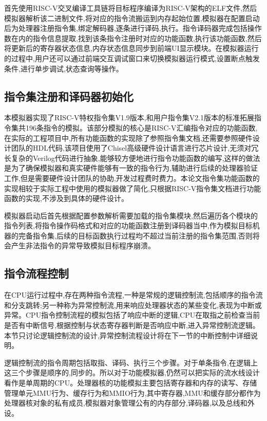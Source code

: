 首先使用RISC-V交叉编译工具链将目标程序编译为RISC-V架构的ELF文件,然后模拟器解析该二进制文件,将对应的指令流搬运到内存起始位置,模拟器在配置启动后为处理器注册指令集,绑定解码器,逐条进行译码,执行。指令译码器完成包括操作数在内的指令信息提取,找到该条指令注册时对应的功能函数,执行该功能函数,然后将更新后的寄存器状态信息,内存状态信息同步到前端UI显示模块。在模拟器运行的过程中,用户还可以通过前端交互调试窗口来切换模拟器运行模式,设置断点触发条件,进行单步调试,状态查询等操作。


\subsection{指令集注册和译码器初始化}
本模拟器实现了RISC-V特权指令集V1.9版本,和用户指令集V2.1版本的标准拓展指令集共196条指令的模拟。该部分模拟的核心是RISC-V汇编指令对应的功能函数,在实际的工程项目中,所有功能函数的实现除了参照指令集文档,还需要参照硬件设计团队的HDL代码,该项目使用了Chisel高级硬件设计语言进行芯片设计,无须对冗长复杂的Verilog代码进行抽象,能够较方便地进行指令功能函数的编写,这样的做法是为了确保模拟器和真实硬件能够有一致的指令行为,辅助进行后续的处理器验证工作,但是需要硬件设计团队的协助,开发过程费时费力。本论文指令集功能函数的实现相较于实际工程中使用的模拟器做了简化,只根据RISC-V指令集文档进行功能函数的实现,不涉及到具体的硬件设计。


模拟器启动后首先根据配置参数解析需要加载的指令集模块,然后遍历各个模块的指令列表,将指令操作码格式和对应的功能函数注册到译码器当中,作为模拟目标机器的完备指令集,后续的目标函数执行过程均不超过当前注册的指令集范围,否则将会产生非法指令的异常导致模拟目标程序崩溃。


\subsection{指令流程控制}
在CPU运行过程中,存在两种指令流程,一种是常规的逻辑控制流,包括顺序的指令流和分支跳转;另一种称为异常控制流,用来响应处理器状态的某些变化,表现为中断或异常。CPU指令控制流程的模拟包括了响应中断的逻辑,CPU在取指之前检查当前是否有中断信号,根据控制与状态寄存器判断是否响应中断,进入异常控制流逻辑。本节只讨论逻辑控制流的设计,异常控制流程设计将在下一节的中断控制中详细说明。


逻辑控制流的指令周期包括取指、译码、执行三个步骤。对于单条指令,在逻辑上这三个步骤是顺序的,同步的。所以对于功能模拟器,仍然可以把实际的流水线设计看作是单周期的CPU。处理器核的功能模拟主要包括寄存器和内存的读写、存储管理单元MMU行为、缓存行为和MMIO行为,其中寄存器,MMU和缓存部分都作为处理器核对象的私有成员,模拟器对象管理公有的内存部分,译码器,以及总线和外设。


